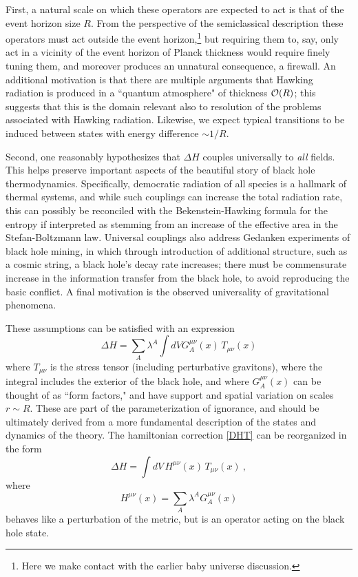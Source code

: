 \documentclass[11pt]{article}
\numberwithin{equation}{section}
\newcommand{\calo}{{\cal O}}
\newcommand{\beq}{\begin{equation}}
\newcommand{\eeq}{\end{equation}}
\begin{document}
First, a natural scale on which these operators are expected to act is that of the event horizon size $R$.  From the perspective of the semiclassical description these operators must act outside the event horizon,\footnote{Here we make contact with the earlier baby universe discussion.} but requiring them to, say, only act in a vicinity of the event horizon of Planck thickness would require finely tuning them, and moreover produces an unnatural consequence, a firewall\cite{SGTrieste,Brau}\cite{AMPS}.   An additional motivation is that there are multiple arguments\cite{SGBoltz,DLP}\cite{SGsch,SG2d,GiPe} that Hawking radiation is produced in a ``quantum atmosphere" of thickness $\calo(R)$; this suggests that this is the domain relevant also to resolution of the problems associated with Hawking radiation.   Likewise, we expect typical transitions to be induced between states with energy difference $\sim 1/R$.

Second, one reasonably hypothesizes that $\Delta H$ couples universally to {\it all} fields.  This helps preserve important aspects of the beautiful story of black hole thermodynamics.  Specifically, democratic radiation of all species is a hallmark of thermal systems, and while such couplings can increase the total radiation rate, this can possibly be reconciled with the Bekenstein-Hawking formula for the entropy if interpreted as stemming from an increase of the effective area in the Stefan-Boltzmann law\cite{SGBoltz}.  Universal couplings also address\cite{NVNL,NVUEFT,NVNLT} Gedanken experiments of black hole mining\cite{UnWamine,LaMa,FrFu,Frol}, in which through introduction of additional structure, such as a cosmic string, a black hole's decay rate increases; there must be commensurate increase in the information transfer from the black hole, to avoid reproducing the basic conflict.  A final motivation is the observed universality of gravitational phenomena.

These assumptions can be satisfied with an expression
\beq\label{DHT}
\Delta H = \sum_A \lambda^A \int dV G_A^{\mu\nu}(x)\,T_{\mu\nu}(x)
\eeq
where $T_{\mu\nu}$ is the stress tensor (including perturbative gravitons), where the integral includes the exterior of the black hole, and where $G^{\mu\nu}_A(x)$ can be thought of as ``form factors," and have support and spatial variation on scales $r\sim R$.  These are part of the parameterization of ignorance, and should be ultimately derived from a more fundamental description of the states and dynamics of the theory.  
The hamiltonian correction \eqref{DHT} can be reorganized in the form
\beq
\Delta H = \int dV\, H^{\mu\nu}(x) \,T_{\mu\nu}(x)\ ,
\eeq
where 
\beq
H^{\mu\nu}(x)=\sum_A\lambda^A G_A^{\mu\nu}(x)
\eeq
behaves like a perturbation of the metric, but is an operator acting on the black hole state.
\end{document}
